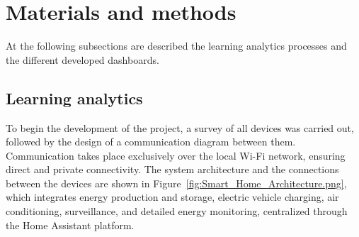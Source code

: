 \documentclass[graybox]{svmult}
\begin{document}








\section{Materials and methods}\label{sec:material_methods}

At the following subsections are described the learning analytics processes and the different developed dashboards.


\subsection{Learning analytics}

To begin the development of the project, a survey of all devices was carried out, followed by the design of a communication diagram between them. Communication takes place exclusively over the local Wi-Fi network, ensuring direct and private connectivity.
The system architecture and the connections between the devices are shown in Figure~\ref{fig:Smart_Home_Architecture.png}, which integrates energy production and storage, electric vehicle charging, air conditioning, surveillance, and detailed energy monitoring, centralized through the Home Assistant platform.
\end{document}
